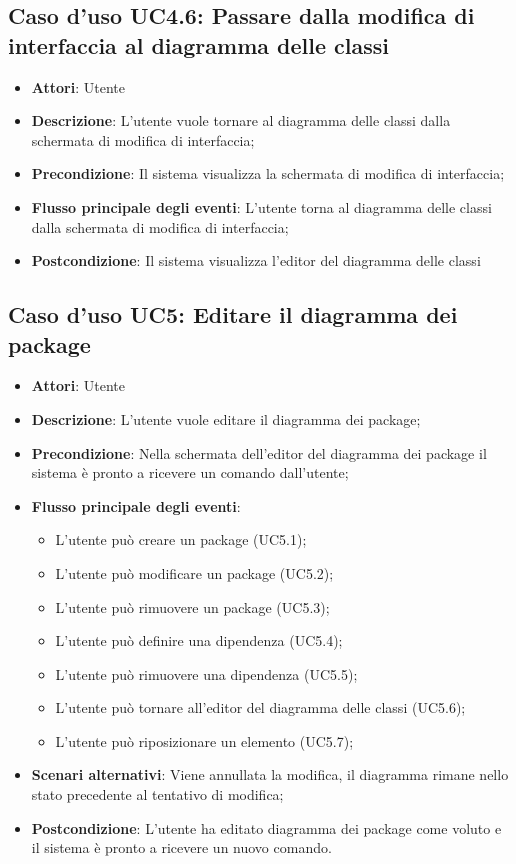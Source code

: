 \documentclass[../AnalisiDeiRequisiti.tex]{subfiles}
\begin{document}
			\subsection{Caso d'uso UC4.6: Passare dalla modifica di interfaccia al diagramma delle classi}
			\begin{itemize}
				\item \textbf{Attori}: Utente
				\item \textbf{Descrizione}: L'utente vuole tornare al diagramma delle classi dalla schermata di modifica di interfaccia;
				\item \textbf{Precondizione}: Il sistema visualizza la schermata di modifica di interfaccia;
				\item \textbf{Flusso principale degli eventi}: L'utente torna al diagramma delle classi dalla schermata di modifica di interfaccia;
				\item \textbf{Postcondizione}: Il sistema visualizza l'editor del diagramma delle classi
			\end{itemize}
			\subsection{Caso d'uso UC5: Editare il diagramma dei package}
			\begin{itemize}
				\item \textbf{Attori}: Utente
				\item \textbf{Descrizione}: L'utente vuole editare il diagramma dei package;
				\item \textbf{Precondizione}: Nella schermata dell'editor del diagramma dei package il sistema è pronto a ricevere un comando dall'utente;
				\item \textbf{Flusso principale degli eventi}: \begin{itemize}
					\item L'utente può creare un package (UC5.1);
					\item L'utente può modificare un package (UC5.2);
					\item L'utente può rimuovere un package (UC5.3);
					\item L'utente può definire una dipendenza (UC5.4);
					\item L'utente può rimuovere una dipendenza (UC5.5);
					\item L'utente può tornare all'editor del diagramma delle classi (UC5.6);
					\item L'utente può riposizionare un elemento (UC5.7);
				\end{itemize}
				\item \textbf{Scenari alternativi}: Viene annullata la modifica, il diagramma rimane nello stato precedente al tentativo di modifica;
				\item \textbf{Postcondizione}: L'utente ha editato diagramma dei package come voluto e il sistema è pronto a ricevere un nuovo comando.
			\end{itemize}
\end{document}
